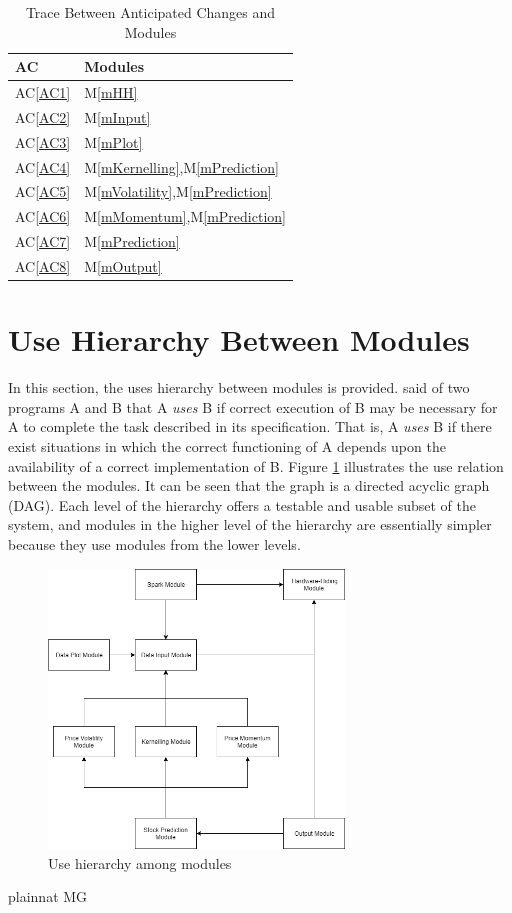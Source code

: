 \documentclass[12pt, titlepage]{article}
\newcommand{\acref}[1]{AC\ref{#1}}
\newcommand{\mref}[1]{M\ref{#1}}
\begin{document}
\begin{table}[H]
\centering
\begin{tabular}{p{} p{}}
\toprule
\textbf{AC} & \textbf{Modules}\\
\midrule
\acref{AC1} & \mref{mHH}\\
\acref{AC2} & \mref{mInput}\\
\acref{AC3} & \mref{mPlot}\\
\acref{AC4} & \mref{mKernelling},\mref{mPrediction}\\
\acref{AC5} & \mref{mVolatility},\mref{mPrediction}\\
\acref{AC6} & \mref{mMomentum},\mref{mPrediction}\\
\acref{AC7} & \mref{mPrediction}\\
\acref{AC8} & \mref{mOutput}\\

\bottomrule
\end{tabular}
\caption{Trace Between Anticipated Changes and Modules}
\label{TblACT}
\end{table}

\section{Use Hierarchy Between Modules} \label{SecUse}

In this section, the uses hierarchy between modules is
provided. \citet{Parnas1978} said of two programs A and B that A {\em uses} B if
correct execution of B may be necessary for A to complete the task described in
its specification. That is, A {\em uses} B if there exist situations in which
the correct functioning of A depends upon the availability of a correct
implementation of B. Figure \ref{FigUH} illustrates the use relation between
the modules. It can be seen that the graph is a directed acyclic graph
(DAG). Each level of the hierarchy offers a testable and usable subset of the
system, and modules in the higher level of the hierarchy are essentially simpler
because they use modules from the lower levels.

\begin{figure}[H]
\centering
\includegraphics[width=0.7\textwidth]{UsesHierarchy.png}

\caption{Use hierarchy among modules}
\label{FigUH}
\end{figure}


 {plainnat}
 {MG}
\end{document}

